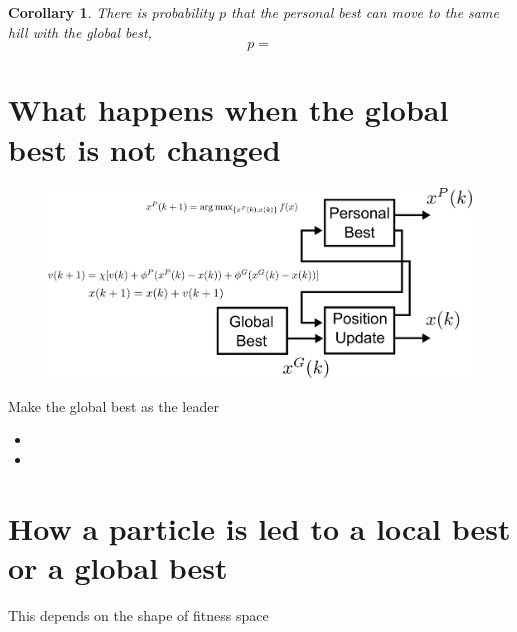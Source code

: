 \documentclass[10pt,a4paper]{article}
\newtheorem{corollary}{Corollary}
\begin{document}
\begin{corollary}
There is probability $ p $ that the personal best can move to the same hill with the global best,
\begin{equation}
p = 
\end{equation}
\end{corollary}

\section{What happens when the global best is not changed}

\begin{figure}
\centering
\includegraphics[width=0.8\linewidth]{./structure_constant_gb}
\caption{}
\label{fig:structure_constant_gb}
\end{figure}


Make the global best as the leader

\begin{itemize}
\item 
\item 
\end{itemize}

\section{How a particle is led to a local best or a global best}

This depends on the shape of fitness space
\end{document}

